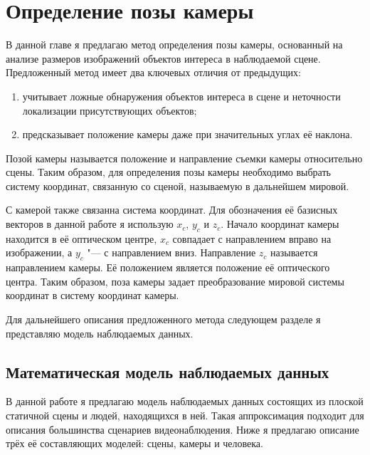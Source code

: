 

\chapter{Определение позы камеры} \label{chapt2}

В данной главе я предлагаю метод определения позы камеры, основанный на анализе размеров изображений объектов интереса в наблюдаемой сцене. Предложенный метод имеет два ключевых отличия от предыдущих:
\begin{enumerate}
\item учитывает ложные обнаружения объектов интереса в сцене и неточности локализации присутствующих объектов;
\item предсказывает положение камеры даже при значительных углах её наклона.
\end{enumerate}

Позой камеры называется положение и направление съемки камеры относительно сцены. Таким образом, для определения позы камеры необходимо выбрать систему координат, связанную со сценой, называемую в дальнейшем мировой.

С камерой также связанна система координат. Для обозначения её базисных векторов в данной работе я использую $x_c$, $y_c$ и $z_c$. Начало координат камеры находится в её оптическом центре, $x_c$ совпадает с направлением вправо на изображении, а $y_c$ "--- с направлением вниз. Направление $z_c$ называется направлением камеры. Её положением является положение её оптического центра. Таким образом, поза камеры задает преобразование мировой системы координат в систему координат камеры.

Для дальнейшего описания предложенного метода следующем разделе я представляю модель наблюдаемых данных.

\section{Математическая модель наблюдаемых данных}  \label{chap-cam_pose::sec-model}

В данной работе я предлагаю модель наблюдаемых данных состоящих из плоской статичной сцены и людей, находящихся в ней. Такая аппроксимация подходит для описания большинства сценариев видеонаблюдения. Ниже я предлагаю описание трёх её составляющих моделей: сцены, камеры и человека.

